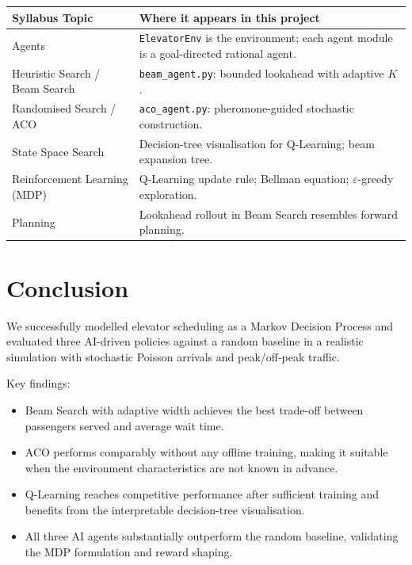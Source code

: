 \documentclass[12pt,a4paper]{article}
\begin{document}
\begin{center}
\begin{tabular}{lp{9cm}}
\toprule
\textbf{Syllabus Topic} & \textbf{Where it appears in this project} \\
\midrule
Agents & \texttt{ElevatorEnv} is the environment; each agent module is a goal-directed rational agent. \\
Heuristic Search / Beam Search & \texttt{beam\_agent.py}: bounded lookahead with adaptive $K$. \\
Randomised Search / ACO & \texttt{aco\_agent.py}: pheromone-guided stochastic construction. \\
State Space Search & Decision-tree visualisation for Q-Learning; beam expansion tree. \\
Reinforcement Learning (MDP) & Q-Learning update rule; Bellman equation; $\varepsilon$-greedy exploration. \\
Planning & Lookahead rollout in Beam Search resembles forward planning. \\
\bottomrule
\end{tabular}
\end{center}

\section{Conclusion}

We successfully modelled elevator scheduling as a Markov Decision Process and
evaluated three AI-driven policies against a random baseline in a realistic
simulation with stochastic Poisson arrivals and peak/off-peak traffic.

Key findings:
\begin{itemize}[leftmargin=2em]
    \item Beam Search with adaptive width achieves the best trade-off between
          passengers served and average wait time.
    \item ACO performs comparably without any offline training, making it suitable
          when the environment characteristics are not known in advance.
    \item Q-Learning reaches competitive performance after sufficient training and
          benefits from the interpretable decision-tree visualisation.
    \item All three AI agents substantially outperform the random baseline,
          validating the MDP formulation and reward shaping.
\end{itemize}
\end{document}
